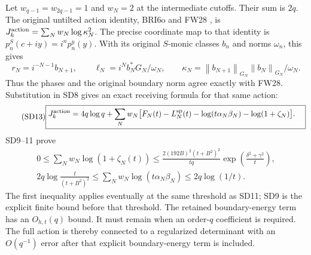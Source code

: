 \documentclass[11pt]{article}
\newcommand{\norm}[1]{\left\lVert#1\right\rVert}
\begin{document}
Let $w_{q-1}=w_{2q-1}=1$ and $w_N=2$ at the intermediate cutoffs.
Their sum is $2q$. The original untilted action identity, BRI6o and
FW28 \cite{FW}, is $J_k^{\rm action}=\sum_Nw_N\log\kappa_N^2$.
The precise coordinate map to that identity is
$p_n^S(c+iy)=i^np_n^y(y)$. With its original $S$-monic classes $b_n$
and norms $\omega_n$, this gives
\[
r_N=i^{-N-1}b_{N+1},\qquad
\ell_N=i^N b_N^*G_N/\omega_N,\qquad
\kappa_N=\norm{b_{N+1}}_{G_N}\norm{b_N}_{G_N}/\omega_N.
\]
Thus the phases and the original boundary norm agree exactly with FW28.
Substitution in SD8 gives an exact receiving formula for that same
action:
\begin{equation}\tag{SD13}
\boxed{\begin{aligned}
J_k^{\rm action}={}&4q\log q+
\sum_Nw_N\bigl[F_N(t)-L_N^{\rm sp}(t)
-\log(t\alpha_N\beta_N)-\log(1+\zeta_N)\bigr].
\end{aligned}}
\end{equation}
SD9--11 prove
\begin{equation}\tag{SD14}
\begin{gathered}
0\le\sum_Nw_N\log(1+\zeta_N(t))
\le\frac{2(192B)^2(t+B^2)^2}{tq}
\exp\!\left(\frac{\delta^2+\gamma^2}{t}\right),\\
2q\log\frac{t}{(t+B^2)^2}
\le\sum_Nw_N\log(t\alpha_N\beta_N)
\le2q\log(1/t).
\end{gathered}
\end{equation}
The first inequality applies eventually at the same threshold as SD11;
SD9 is the explicit finite bound before that threshold. The retained
boundary-energy term has an $O_{h,t}(q)$ bound. It must remain when an
order-$q$ coefficient is required. The full action is thereby connected
to a regularized determinant with an $O(q^{-1})$ error after that
explicit boundary-energy term is included.
\end{document}
